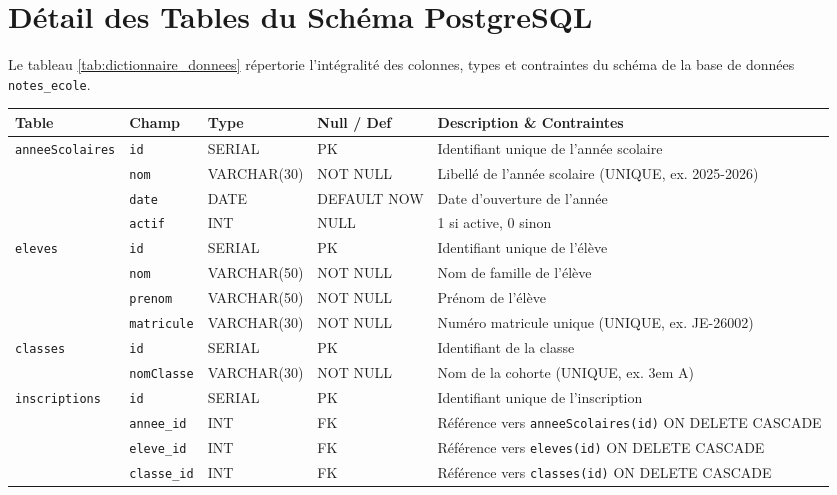 \documentclass[11pt,a4paper,oneside]{report}
\begin{document}
\section{Détail des Tables du Schéma PostgreSQL}

Le tableau \ref{tab:dictionnaire_donnees} répertorie l'intégralité des colonnes, types et contraintes du schéma de la base de données \texttt{notes\_ecole}.

\begin{table}[H]
    \centering
    \footnotesize
    \begin{tabularx}{\textwidth}{llllX}
        \toprule
        \textbf{Table} & \textbf{Champ} & \textbf{Type} & \textbf{Null / Def} & \textbf{Description \& Contraintes} \\
        \midrule
        \texttt{anneeScolaires} & \texttt{id} & SERIAL & PK & Identifiant unique de l'année scolaire \\
        & \texttt{nom} & VARCHAR(30) & NOT NULL & Libellé de l'année scolaire (UNIQUE, ex. 2025-2026) \\
        & \texttt{date} & DATE & DEFAULT NOW & Date d'ouverture de l'année \\
        & \texttt{actif} & INT & NULL & 1 si active, 0 sinon \\
        \midrule
        \texttt{eleves} & \texttt{id} & SERIAL & PK & Identifiant unique de l'élève \\
        & \texttt{nom} & VARCHAR(50) & NOT NULL & Nom de famille de l'élève \\
        & \texttt{prenom} & VARCHAR(50) & NOT NULL & Prénom de l'élève \\
        & \texttt{matricule} & VARCHAR(30) & NOT NULL & Numéro matricule unique (UNIQUE, ex. JE-26002) \\
        \midrule
        \texttt{classes} & \texttt{id} & SERIAL & PK & Identifiant de la classe \\
        & \texttt{nomClasse} & VARCHAR(30) & NOT NULL & Nom de la cohorte (UNIQUE, ex. 3em A) \\
        \midrule
        \texttt{inscriptions} & \texttt{id} & SERIAL & PK & Identifiant unique de l'inscription \\
        & \texttt{annee\_id} & INT & FK & Référence vers \texttt{anneeScolaires(id)} ON DELETE CASCADE \\
        & \texttt{eleve\_id} & INT & FK & Référence vers \texttt{eleves(id)} ON DELETE CASCADE \\
        & \texttt{classe\_id} & INT & FK & Référence vers \texttt{classes(id)} ON DELETE CASCADE \\

\end{tabularx}
\end{table}
\end{document}
